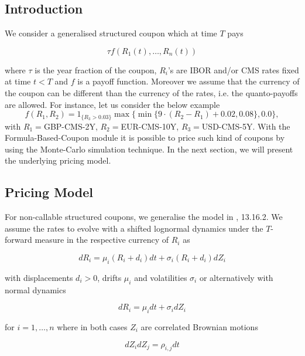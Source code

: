 \documentclass[12pt, a4paper]{article}
\begin{document}
\subsection{Introduction}

We consider a generalised structured coupon which at time $T$ pays

\begin{equation} \tau f(R_1(t), \ldots, R_n(t))
\end{equation}

where $\tau$ is the year fraction of the coupon, $R_i$'s are IBOR and/or CMS rates fixed at time $t<T$ and $f$ is a
payoff function. Moreover we assume that the currency of the coupon can be different than the currency of the rates,
i.e. the quanto-payoffs are allowed. For instance, let us consider the below example
%
\begin{equation}
f(R_1, R_2) = 1_{\{R_3>0.03\}}\max\{\min\{9\cdot (R_2-R_1)+0.02,0.08\},0.0\},
\label{eq:FBCpayoff}
\end{equation}
%
with $R_1=$GBP-CMS-2Y, $R_2=$EUR-CMS-10Y, $R_3=$USD-CMS-5Y. With the Formula-Based-Coupon module it is possible to price
such kind of coupons by using the Monte-Carlo simulation technique. In the next section, we will present the underlying
pricing model.

\subsection{Pricing Model}
\label{ssection_FormulaBasedLegPricingModel}
For non-callable structured coupons, we generalise the model in
\cite{brigo}, 13.16.2. We assume the rates
to evolve with a shifted lognormal dynamics under the $T$-forward
measure in the respective currency of $R_i$ as

\begin{equation}\label{lndyn} dR_i = \mu_i (R_i + d_i) dt + \sigma_i
(R_i + d_i) dZ_i
\end{equation}

with displacements $d_i>0$, drifts $\mu_i$ and volatilities $\sigma_i$
or alternatively with normal dynamics

\begin{equation}\label{ndyn} dR_i = \mu_i dt + \sigma_i dZ_i
\end{equation}

for $i=1,\ldots,n$ where in both cases $Z_i$ are correlated Brownian
motions

\begin{equation} dZ_i dZ_j = \rho_{i,j} dt
\end{equation}
\end{document}
